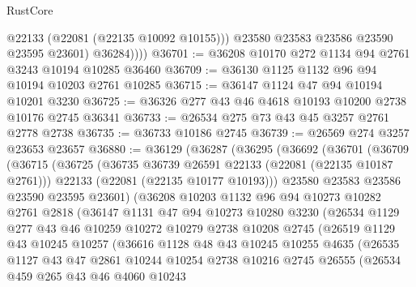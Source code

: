 \begin{lexlean}{RustCore}
\begin{coremodule}
                @22133
                (@22081 (@22135 @10092 @10155)))
              @23580
              @23583
              @23586
              @23590
              @23595
              @23601)
            @36284))))
@36701 := @36208 @10170 @272 @1134 @94 @2761 @3243 @10194 @10285 @36460
@36709 := @36130 @1125 @1132 @96 @94 @10194 @10203 @2761 @10285
@36715 := @36147 @1124 @47 @94 @10194 @10201 @3230
@36725 := @36326 @277 @43 @46 @4618 @10193 @10200 @2738 @10176 @2745 @36341
@36733 := @26534 @275 @73 @43 @45 @3257 @2761 @2778 @2738
@36735 := @36733 @10186 @2745
@36739 := @26569 @274 @3257 @23653 @23657
@36880 := @36129
    (@36287
      (@36295
        (@36692
          (@36701
            (@36709
              (@36715
                (@36725
                  (@36735 @36739 @26591 @22133 (@22081 (@22135 @10187 @2761)))
                  @22133
                  (@22081 (@22135 @10177 @10193)))
                @23580
                @23583
                @23586
                @23590
                @23595
                @23601)
              (@36208
                @10203
                @1132
                @96
                @94
                @10273
                @10282
                @2761
                @2818
                (@36147
                  @1131
                  @47
                  @94
                  @10273
                  @10280
                  @3230
                  (@26534
                    @1129
                    @277
                    @43
                    @46
                    @10259
                    @10272
                    @10279
                    @2738
                    @10208
                    @2745
                    (@26519
                      @1129
                      @43
                      @10245
                      @10257
                      (@36616
                        @1128
                        @48
                        @43
                        @10245
                        @10255
                        @4635
                        (@26535
                          @1127
                          @43
                          @47
                          @2861
                          @10244
                          @10254
                          @2738
                          @10216
                          @2745
                          @26555
                          (@26534
                            @459
                            @265
                            @43
                            @46
                            @4060
                            @10243

\end{coremodule}
\end{lexlean}
